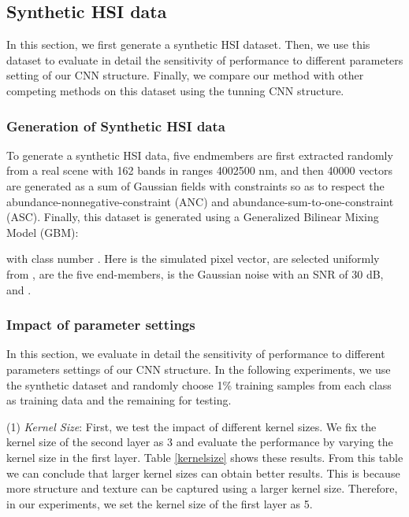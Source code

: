 \documentclass[journal]{IEEEtran}
\begin{document}
		\subsection{Synthetic HSI data}
		
		{{In this section, we first generate a synthetic HSI dataset. Then, we use this dataset to evaluate in detail the sensitivity of performance to different parameters setting of our CNN structure. Finally, we compare our method with other competing methods on this dataset using the tunning CNN structure.}}
		
		\subsubsection{Generation of Synthetic HSI data}
		To generate a synthetic HSI data, five endmembers are first extracted  randomly from a real scene with 162 bands in ranges 4002500 nm, and then 40000 vectors are generated as a sum of Gaussian fields with constraints so as to respect the abundance-nonnegative-constraint (ANC) and abundance-sum-to-one-constraint (ASC). Finally, this dataset is generated using a Generalized Bilinear Mixing Model (GBM)\cite{zhu2017unsupervised}:
		
		with class number . Here  is the simulated pixel vector,  are selected uniformly from ,  are the five end-members,  is the Gaussian noise with an SNR of 30 dB,  and . 
		


		\subsubsection{Impact of parameter settings}
		In this section, we evaluate in detail the sensitivity of performance to different parameters settings {{of our CNN structure}}. In the following experiments, we use {{the synthetic dataset}} and randomly choose 1\% training samples from each class as training data and the remaining for testing.
		
		(1) \textit{Kernel Size}: First, we test the impact of different kernel sizes. We fix the kernel size of the second layer as 3 and evaluate the performance by varying the kernel size in the first layer. Table \ref{kernelsize} shows these results. From this table we can conclude that larger kernel sizes can obtain better results. This is because more structure and texture can be captured using a larger kernel size. Therefore, in our experiments, we set the kernel size of the first layer as 5.  
		
\end{document}
